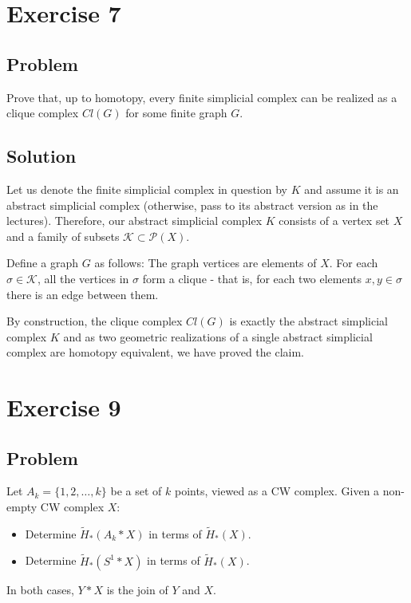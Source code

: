 \documentclass{article}
\begin{document}
\section*{Exercise 7}
\subsection*{Problem}
Prove that, up to homotopy, every finite simplicial complex can be realized as a clique complex $Cl(G)$ for some finite graph $G$.
\subsection*{Solution}
Let us denote the finite simplicial complex in question by $K$ and assume it is an abstract simplicial complex (otherwise, pass to its abstract version as in the lectures).
Therefore, our abstract simplicial complex $K$ consists of a vertex set $X$ and a family of subsets $\mathcal{K} \subset \mathcal{P}(X)$.

Define a graph $G$ as follows: The graph vertices are elements of $X$.
For each $\sigma \in \mathcal{K}$, all the vertices in $\sigma$ form a clique - that is, for each two elements $x, y \in \sigma$ there is an edge between them.

By construction, the clique complex $Cl(G)$ is exactly the abstract simplicial complex $K$ and as two geometric realizations of a single abstract simplicial complex are homotopy equivalent, we have proved the claim.
\newpage
\section*{Exercise 9}
\subsection*{Problem}
Let $A_k = \{1, 2, \dots , k \}$ be a set of $k$ points, viewed as a CW complex. Given a
non-empty CW complex $X$:
\begin{itemize}
\item Determine $\tilde{H}_* (A_k * X)$ in terms of $\tilde{H}_* (X)$.
\item Determine $\tilde{H}_* (S^1 * X)$ in terms of $\tilde{H}_* (X)$.
\end{itemize}
In both cases, $Y * X$ is the join of $Y$ and $X$.
\end{document}
